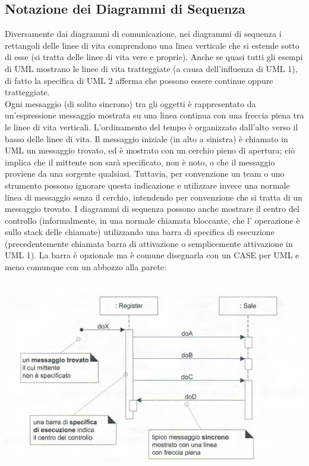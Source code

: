\documentclass[a4paper,12pt, oneside]{book}
\begin{document}
\subsection{Notazione dei Diagrammi di Sequenza}
Diversamente dai diagrammi di comunicazione, nei diagrammi di sequenza i rettangoli delle linee di vita comprendono una linea verticale che si estende sotto di esse (si tratta delle linee di vita vere e proprie). Anche se quasi tutti gli esempi di UML mostrano le linee di vita tratteggiate (a causa dell'influenza di UML 1), di fatto la specifica di UML 2 afferma che possono essere continue oppure tratteggiate.\\
Ogni messaggio (di solito sincrono) tra gli oggetti è rappresentato da un'espressione messaggio mostrata su una linea continua con una freccia piena tra le linee di vita verticali. L'ordinamento del tempo è organizzato dall'alto verso il basso delle linee di vita. Il messaggio iniziale (in alto a sinistra) è chiamato in
UML un messaggio trovato, ed è mostrato con un cerchio pieno di apertura; ciò implica che il mittente non sarà specificato, non è noto, o che il messaggio proviene da una sorgente qualsiasi. Tuttavia, per convenzione un team o uno strumento possono ignorare questa indicazione e utilizzare invece una normale linea di messaggio senza il cerchio, intendendo per convenzione che si tratta di un messaggio trovato. I diagrammi di sequenza possono anche mostrare il
centro del controllo (informalmente, in una normale chiamata bloccante, che l' operazione è sullo stack delle chiamate) utilizzando una barra di specifica di esecuzione (precedentemente chiamata barra di attivazione o semplicemente attivazione in UML 1). 
\newpage
La barra è opzionale ma è comune disegnarla con un CASE per UML e meno comunque con un abbozzo alla parete:
\begin{center}
	\includegraphics[scale=0.7]{img/msgd.png}
\end{center}
\end{document}
